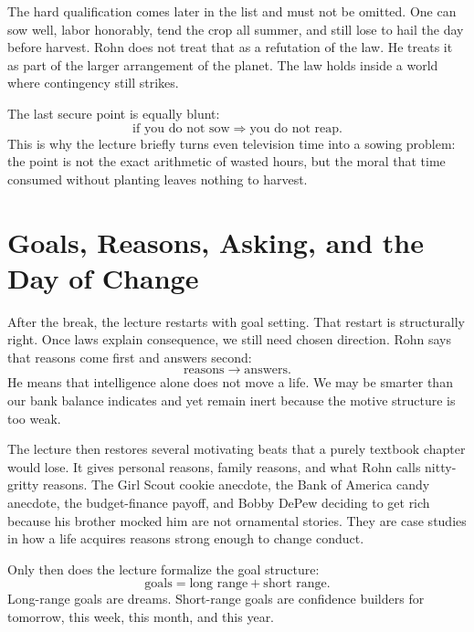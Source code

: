 The hard qualification comes later in the list and must not be omitted. One can sow well, labor honorably, tend the crop all summer, and still lose to hail the day before harvest. Rohn does not treat that as a refutation of the law. He treats it as part of the larger arrangement of the planet. The law holds inside a world where contingency still strikes.

The last secure point is equally blunt:
\begin{equation}
\text{if you do not sow} \Rightarrow \text{you do not reap}.
\end{equation}
This is why the lecture briefly turns even television time into a sowing problem: the point is not the exact arithmetic of wasted hours, but the moral that time consumed without planting leaves nothing to harvest.

\section{Goals, Reasons, Asking, and the Day of Change}

After the break, the lecture restarts with goal setting. That restart is structurally right. Once laws explain consequence, we still need chosen direction. Rohn says that reasons come first and answers second:
\begin{equation}
\text{reasons} \to \text{answers}.
\end{equation}
He means that intelligence alone does not move a life. We may be smarter than our bank balance indicates and yet remain inert because the motive structure is too weak.

The lecture then restores several motivating beats that a purely textbook chapter would lose. It gives personal reasons, family reasons, and what Rohn calls nitty-gritty reasons. The Girl Scout cookie anecdote, the Bank of America candy anecdote, the budget-finance payoff, and Bobby DePew deciding to get rich because his brother mocked him are not ornamental stories. They are case studies in how a life acquires reasons strong enough to change conduct.

Only then does the lecture formalize the goal structure:
\begin{equation}
\text{goals} = \text{long range} + \text{short range}.
\end{equation}
Long-range goals are dreams. Short-range goals are confidence builders for tomorrow, this week, this month, and this year.

